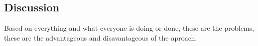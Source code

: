 
\subsection{Discussion}
\label{subsec:RelWorkDiscussion}

Based on everything and what everyone is doing or done, these are the problems, these are the advantageous and disavantageous of the aproach.